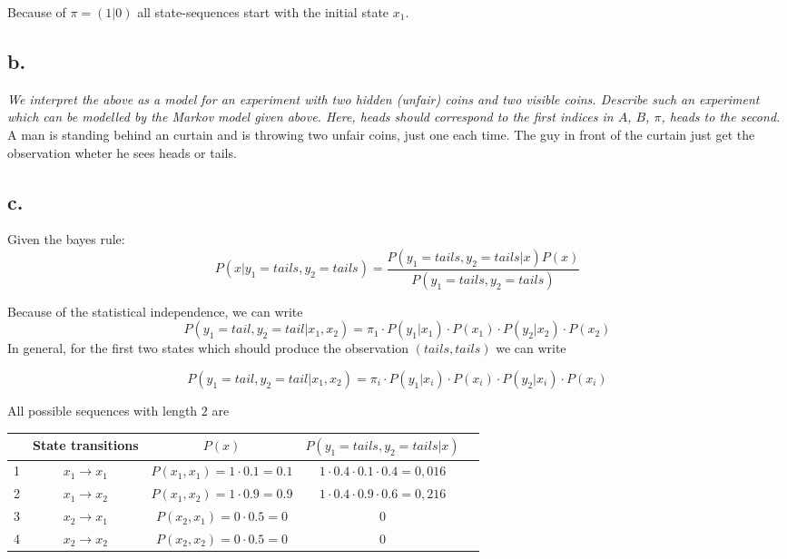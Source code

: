 \documentclass[a4paper, 12pt, titlepage]{article}
\begin{document}
Because of $\pi = (1 | 0)$ all state-sequences start with the initial state $x_1$.
  
\subsection{b.}


\textit{We interpret the above as a model for an experiment with two hidden (unfair) coins and two visible coins. Describe such an experiment which can be modelled by the Markov model given above. Here, heads should correspond to the first indices in $A$, $B$, $\pi$, heads to the second.} \newline \newline
A man is standing behind an curtain and is throwing two unfair coins, just one each time. The guy in front of the curtain just get the observation wheter he sees heads or tails. 

\newpage
\subsection{c.}

Given the bayes rule:
\begin{equation}
   P(x|y_1=tails,y_2=tails) =  \frac{P(y_1=tails,y_2=tails|x)P(x)}{P(y_1=tails,y_2=tails)}
\end{equation}

Because of the statistical independence, we can write
\begin{equation}
  P(y_1=tail,y_2=tail|x_1,x_2) = \pi_1 \cdot P(y_1|x_1) \cdot P(x_1) \cdot P(y_2|x_2) \cdot P(x_2)
\end{equation}
In general, for the first two states which should produce the observation $(tails,tails)$ we can write

\begin{equation}
  P(y_1=tail,y_2=tail|x_1,x_2) = \pi_i \cdot P(y_1|x_i) \cdot P(x_i) \cdot P(y_2|x_i) \cdot P(x_i)
\end{equation}

All possible sequences with length $2$ are

\begin{tabular}{l*{3}{c}r}
              & State transitions & $P(x)$ & $P(y_1=tails,y_2=tails|x) $ \\
\hline
1 &  $x_1 \rightarrow x_1$ & $P(x_1,x_1)= 1\cdot0.1=0.1$ & $ 1\cdot0.4\cdot0.1\cdot0.4=0,016 $\\
2 &  $x_1 \rightarrow x_2$ & $P(x_1,x_2)= 1\cdot0.9=0.9$ & $ 1\cdot0.4\cdot0.9\cdot0.6=0,216 $ \\
3 &  $x_2 \rightarrow x_1$ & $P(x_2,x_1)= 0\cdot0.5=0$ & $ 0 $ \\
4 &  $x_2 \rightarrow x_2$ & $P(x_2,x_2)= 0\cdot0.5=0$ & $ 0 $
 \end{tabular}
\end{document}
